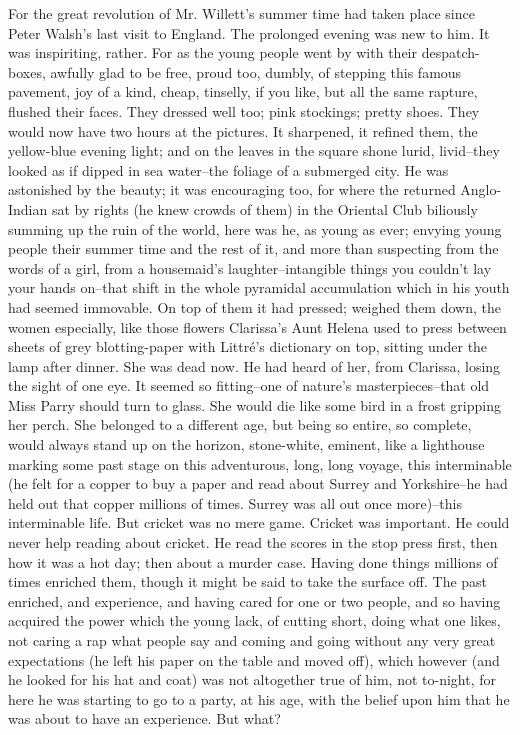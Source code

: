 \documentclass[lang=cn,10pt]{elegantbook}
\begin{document}
For the great revolution of Mr. Willett's summer time had taken
place since Peter Walsh's last visit to England.  The prolonged
evening was new to him.  It was inspiriting, rather.  For as the
young people went by with their despatch-boxes, awfully glad to be
free, proud too, dumbly, of stepping this famous pavement, joy of a
kind, cheap, tinselly, if you like, but all the same rapture,
flushed their faces.  They dressed well too; pink stockings; pretty
shoes.  They would now have two hours at the pictures.  It
sharpened, it refined them, the yellow-blue evening light; and on
the leaves in the square shone lurid, livid--they looked as if
dipped in sea water--the foliage of a submerged city.  He was
astonished by the beauty; it was encouraging too, for where the
returned Anglo-Indian sat by rights (he knew crowds of them) in the
Oriental Club biliously summing up the ruin of the world, here was
he, as young as ever; envying young people their summer time and
the rest of it, and more than suspecting from the words of a girl,
from a housemaid's laughter--intangible things you couldn't lay
your hands on--that shift in the whole pyramidal accumulation which
in his youth had seemed immovable.  On top of them it had pressed;
weighed them down, the women especially, like those flowers
Clarissa's Aunt Helena used to press between sheets of grey
blotting-paper with Littré's dictionary on top, sitting under the
lamp after dinner.  She was dead now.  He had heard of her, from
Clarissa, losing the sight of one eye.  It seemed so fitting--one
of nature's masterpieces--that old Miss Parry should turn to glass.
She would die like some bird in a frost gripping her perch.  She
belonged to a different age, but being so entire, so complete,
would always stand up on the horizon, stone-white, eminent, like a
lighthouse marking some past stage on this adventurous, long, long
voyage, this interminable (he felt for a copper to buy a paper and
read about Surrey and Yorkshire--he had held out that copper
millions of times.  Surrey was all out once more)--this
interminable life.  But cricket was no mere game.  Cricket was
important.  He could never help reading about cricket.  He read the
scores in the stop press first, then how it was a hot day; then
about a murder case.  Having done things millions of times enriched
them, though it might be said to take the surface off.  The past
enriched, and experience, and having cared for one or two people,
and so having acquired the power which the young lack, of cutting
short, doing what one likes, not caring a rap what people say and
coming and going without any very great expectations (he left his
paper on the table and moved off), which however (and he looked for
his hat and coat) was not altogether true of him, not to-night, for
here he was starting to go to a party, at his age, with the belief
upon him that he was about to have an experience.  But what?
\end{document}
